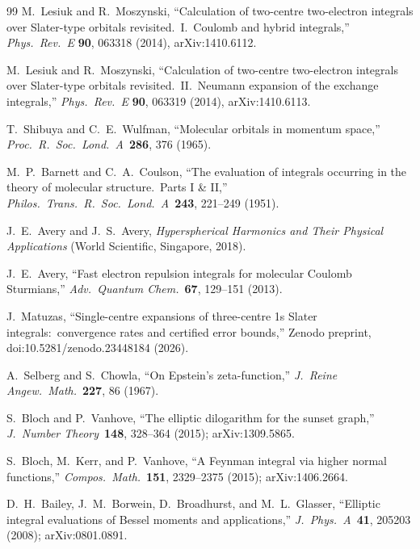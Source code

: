 \documentclass[aps,pra,twocolumn,superscriptaddress,longbibliography]{revtex4-2}
\begin{document}
\begin{thebibliography}{99}
M.~Lesiuk and R.~Moszynski, ``Calculation of two-centre two-electron integrals
over Slater-type orbitals revisited.\ I.\ Coulomb and hybrid integrals,''
\textit{Phys.\ Rev.\ E} \textbf{90}, 063318 (2014), arXiv:1410.6112.

M.~Lesiuk and R.~Moszynski, ``Calculation of two-centre two-electron integrals
over Slater-type orbitals revisited.\ II.\ Neumann expansion of the exchange
integrals,'' \textit{Phys.\ Rev.\ E} \textbf{90}, 063319 (2014), arXiv:1410.6113.

T.~Shibuya and C.~E.~Wulfman, ``Molecular orbitals in momentum space,''
\textit{Proc.\ R.\ Soc.\ Lond.\ A}\ \textbf{286}, 376 (1965).

M.~P.~Barnett and C.~A.~Coulson, ``The evaluation of integrals occurring
in the theory of molecular structure.\ Parts I \& II,''
\textit{Philos.\ Trans.\ R.\ Soc.\ Lond.\ A}\ \textbf{243}, 221--249 (1951).

J.~E.~Avery and J.~S.~Avery, \textit{Hyperspherical Harmonics and Their
Physical Applications} (World Scientific, Singapore, 2018).

J.~E.~Avery, ``Fast electron repulsion integrals for molecular Coulomb
Sturmians,'' \textit{Adv.\ Quantum Chem.}\ \textbf{67}, 129--151 (2013).

J.~Matuzas, ``Single-centre expansions of three-centre 1s Slater integrals:\ convergence rates
and certified error bounds,'' Zenodo preprint, doi:10.5281/zenodo.23448184 (2026).

A.~Selberg and S.~Chowla, ``On Epstein's zeta-function,''
\textit{J.\ Reine Angew.\ Math.}\ \textbf{227}, 86 (1967).

S.~Bloch and P.~Vanhove, ``The elliptic dilogarithm for the sunset graph,''
\textit{J.\ Number Theory}\ \textbf{148}, 328--364 (2015); arXiv:1309.5865.

S.~Bloch, M.~Kerr, and P.~Vanhove, ``A Feynman integral via higher normal
functions,'' \textit{Compos.\ Math.}\ \textbf{151}, 2329--2375 (2015);
arXiv:1406.2664.

D.~H.~Bailey, J.~M.~Borwein, D.~Broadhurst, and M.~L.~Glasser, ``Elliptic
integral evaluations of Bessel moments and applications,''
\textit{J.\ Phys.\ A}\ \textbf{41}, 205203 (2008); arXiv:0801.0891.


\end{thebibliography}
\end{document}
